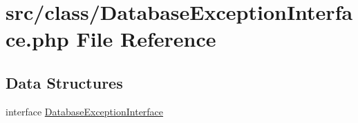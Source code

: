 \hypertarget{_database_exception_interface_8php}{}\section{src/class/\+Database\+Exception\+Interface.php File Reference}
\label{_database_exception_interface_8php}
\subsection*{Data Structures}
\begin{DoxyCompactItemize}
\item 
interface \hyperlink{interface_database_exception_interface}{Database\+Exception\+Interface}
\end{DoxyCompactItemize}
